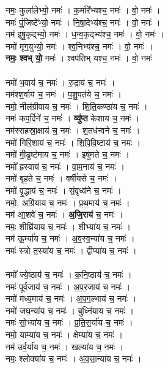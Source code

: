 नमः॒ कुला॑लेभ्यो॒ नमः॑ । क॒र्मारे᳚भ्यश्च॒ नमः॑ । वो॒ नमः॑ ।\\
नमः॑ पुं॒जिष्टे᳚भ्यो॒ नमः॑ । नि॒षा॒देभ्य॑श्च॒ नमः॑ । वो॒ नमः॑ ।\\
नम॑ इषु॒कृद्भ्यो॒ नमः॑ । ध॒न्व॒कृद्भ्य॑श्च॒ नमः॑ । वो॒ नमः॑ ।\\
नमो॑ मृग॒युभ्यो॒ नमः॑ । श्व॒निभ्य॑श्च॒ नमः॑ । वो॒ नमः॑ ।\\
\textbf{नमः॒ श्वभ् यो॒} नमः॑ । श्वप॑तिभ् यश्च॒ नमः॑ । वो॒ नमः॑\\
\\
नमो॑ भ॒वाय॑ च॒ नमः॑ । रु॒द्राय॑ च॒ नमः॑ ।\\
नम॑श्श॒र्वाय॑ च॒ नमः॑ । प॒शु॒पत॑ये च॒ नमः॑ ।\\
नमो॒ नील॑ग्रीवाय च॒ नमः॑ । शि॒ति॒कण्ठा॑य च॒ नमः॑ ।\\
नमः॑ कप॒र्दिने॑ च॒ नमः॑ । \textbf{व्यु॑प्त} केशाय च॒ नमः॑ ।\\
नम॑स्सहस्रा॒क्षाय॑ च॒ नमः॑ । श॒तध॑न्वने च॒ नमः॑ ।\\
नमो॑ गिरि॒शाय॑ च॒ नमः॑ । शि॒पि॒वि॒ष्टाय॑ च॒ नमः॑ ।\\
नमो॑ मी॒ढुष्ट॑माय च॒ नमः॑ । इषु॑मते च॒ नमः॑ ।\\
नमो᳚ ह्रस्वाय॑ च॒ नमः॑ । वा॒म॒नाय॑ च॒ नमः॑ ।\\
नमो॑ बृह॒ते च॒ नमः॑ । वर्षी॑यसे च॒ नमः॑ ।\\
नमो॑ वृ॒द्धाय॑ च॒ नमः॑ । सं॒वृध्व॑ने च॒ नमः॑ ।\\
नमो॒, अग्रि॑याय च॒ नमः॑ । प्र॒थ॒माय॑ च॒ नमः॑ ।\\
नम॑ आ॒शवे॑ च॒ नमः॑ । \textbf{अ॒जि॒राय॑} च॒ नमः॑ ।\\
नमः॒ शीघ्रि॑याय च॒ नमः॑ । शीभ्या॑य च॒ नमः॑ ।\\
नम॑ ऊ॒र्म्या॑य च॒ नमः॑ । अ॒व॒स्व॒न्या॑य च॒ नमः॑ ।\\
नमः॑ स्त्रो त॒स्या॑य च॒ नमः॑ । द्वीप्या॑य च॒ नमः॑ ।\\
\\
नमो᳚ ज्ये॒ष्ठाय॑ च॒ नमः॑ । क॒नि॒ष्ठाय॑ च॒ नमः॑ ।\\
नमः॑ पूर्व॒जाय॑ च॒ नमः॑ । अ॒प॒र॒जाय॑ च॒ नमः॑ ।\\
नमो॑ मध्य॒माय॑ च॒ नमः॑ । अ॒प॒ग॒ल्भाय॑ च॒ नमः॑ ।\\
नमो॑ जघ॒न्या॑य च॒ नमः॑ । बुध्नि॑याय च॒ नमः॑ ।\\
नमः॑ सो॒भ्या॑य च॒ नमः॑ । प्र॒ति॒स॒र्या॑य च॒ नमः॑ ।\\
नमो॒ याम्या॑य च॒ नमः॑ । क्षेम्या॑य च॒ नमः॑ ।\\
नम॑ उर्व॒र्या॑य च॒ नमः॑ । खल्या॑य च॒ नमः॑ ।\\
नमः॒ श्लोक्या॑य च॒ नमः॑ । अ॒व॒सा॒न्या॑य च॒ नमः॑ ।\\
